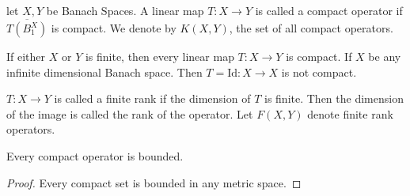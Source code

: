 
\chapter{}

\begin{definition}
  let $X, Y$ be Banach Spaces. A linear map $T : X \to Y$ is called a
  compact operator if $\overline{T(B_1^X)}$ is compact. We denote by
  $K(X, Y)$, the set of all compact operators.
\end{definition}

\begin{example}
  If either $X$ or $Y$ is finite, then every linear map $T: X \to Y$
  is compact. If $X$ be any infinite dimensional Banach space. Then
  $T = \textrm{Id} : X \to X$ is not compact.
\end{example}

\begin{definition}
  $T: X \to Y$ is called a finite rank if the dimension of $T$ is
  finite. Then the dimension of the image is called the rank of the
  operator. Let $F(X, Y)$ denote finite rank operators.
\end{definition}

\begin{lemma}
  Every compact operator is bounded.
\end{lemma}
\begin{proof}
  Every compact set is bounded in any metric space.
\end{proof}

